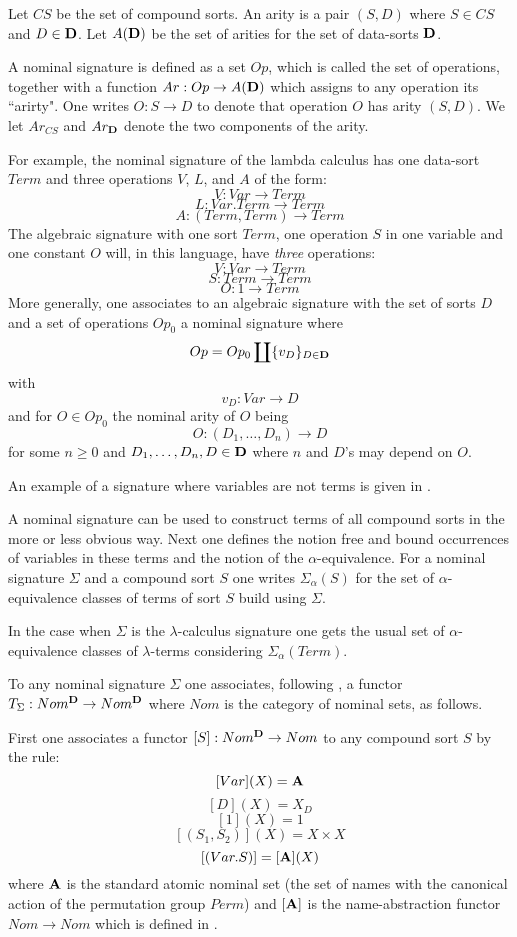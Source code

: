 \documentclass[11pt]{article}
\newcommand{\sr}{\rightarrow}
\begin{document}
{ Let $CS$ be the set of compound sorts. An arity is a pair $(S,D)$ where $S\in CS$ and $D\in {\bf D}$. Let $A({\bf D})$ be the set of arities for the set of data-sorts $\bf D$. 

A nominal signature is defined as a set $Op$, which is called the set of operations, together with a function  $Ar:Op\sr A({\bf D})$ which assigns to any operation its ``arirty". One writes $O:S\sr D$ to denote that operation $O$ has arity $(S,D)$. We let $Ar_{CS}$ and $Ar_{\bf D}$ denote the two components of the arity. 

For example, the nominal signature of the lambda calculus has one data-sort $Term$ and three operations $V$, $L$, and $A$  of the form:
%
$$V:Var\sr Term$$
$$L:Var.Term\sr Term$$
$$A:(Term,Term)\sr Term$$
%
The algebraic signature with one sort $Term$, one operation $S$ in one variable and one constant $O$ will, in this language, have {\em three}  operations:
%
$$V:Var\sr Term$$
$$S: Term\sr Term$$
$$O:1\sr Term$$
%
More generally, one associates to an algebraic signature with the set of sorts $D$ and a set of operations $Op_0$ a nominal signature where 
%
$$Op=Op_0\coprod\{v_D\}_{D\in {\bf D}}$$
%
with 
%
$$v_D:Var\sr D$$
%
and for $O\in Op_0$ the nominal arity of $O$ being
%
$$O:(D_1,\dots,D_n)\sr D$$
%
for some $n\ge 0$ and $D_1,\dots,D_n,D\in {\bf D}$ where $n$ and $D$'s may depend on $O$.  

An example of a signature where variables are not terms is given in \cite{Pitts}. 

A nominal signature can be used to construct terms of all compound sorts in the more or less obvious way. Next one defines the notion free and bound occurrences of variables in these terms and the notion of the  $\alpha$-equivalence. For a nominal signature $\Sigma$ and a compound sort $S$ one writes $\Sigma_{\alpha}(S)$ for the set of $\alpha$-equivalence classes of terms of sort $S$ build using $\Sigma$.

In the case when $\Sigma$ is the $\lambda$-calculus signature one gets the usual set of $\alpha$-equivalence classes of $\lambda$-terms considering $\Sigma_{\alpha}(Term)$. 

To any nominal signature $\Sigma$ one associates, following \cite{Pitts}, a functor $T_{\Sigma}:Nom^{\bf D}\sr Nom^{\bf D}$ where $Nom$ is the category of nominal sets, as follows.

First one associates a functor $[S]:Nom^{\bf D}\sr Nom$ to any compound sort $S$ by the rule:
%
$$[Var](X)={\bf A}$$
$$[D](X)=X_D$$
$$[1](X)=1$$
$$[(S_1,S_2)](X)=X\times X$$
$$[(Var.S)]=[{\bf A}](X)$$
%
where ${\bf A}$ is the standard atomic nominal set (the set of names with the canonical action of the permutation group $Perm$) and $[{\bf A}]$ is the name-abstraction functor $Nom\sr Nom$ which is defined in \cite[Section 4]{Pitts}. 

}
\end{document}
